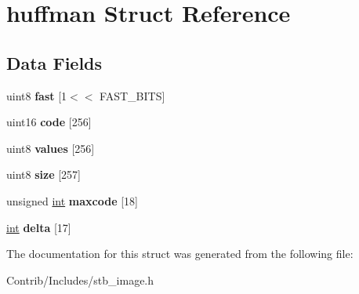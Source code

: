 \hypertarget{structhuffman}{}\section{huffman Struct Reference}
\label{structhuffman}
\subsection*{Data Fields}
\begin{DoxyCompactItemize}
\item 
uint8 {\bfseries fast} \mbox{[}1$<$$<$ F\+A\+S\+T\+\_\+\+B\+I\+TS\mbox{]}\hypertarget{structhuffman_ad836475a017b1b444e9a914e1eec51d0}{}\label{structhuffman_ad836475a017b1b444e9a914e1eec51d0}

\item 
uint16 {\bfseries code} \mbox{[}256\mbox{]}\hypertarget{structhuffman_a0fc037b98e20124af388ef635f803e46}{}\label{structhuffman_a0fc037b98e20124af388ef635f803e46}

\item 
uint8 {\bfseries values} \mbox{[}256\mbox{]}\hypertarget{structhuffman_af5220e65f3703ec44b1d560a64289c48}{}\label{structhuffman_af5220e65f3703ec44b1d560a64289c48}

\item 
uint8 {\bfseries size} \mbox{[}257\mbox{]}\hypertarget{structhuffman_af04b11aec0852598c7715255ebaf6ca2}{}\label{structhuffman_af04b11aec0852598c7715255ebaf6ca2}

\item 
unsigned \hyperlink{_s_d_l__thread_8h_a6a64f9be4433e4de6e2f2f548cf3c08e}{int} {\bfseries maxcode} \mbox{[}18\mbox{]}\hypertarget{structhuffman_a8cadba645a8c1ea9b2bb85317c877d30}{}\label{structhuffman_a8cadba645a8c1ea9b2bb85317c877d30}

\item 
\hyperlink{_s_d_l__thread_8h_a6a64f9be4433e4de6e2f2f548cf3c08e}{int} {\bfseries delta} \mbox{[}17\mbox{]}\hypertarget{structhuffman_aadb642e8e056b2abcdcd60629d5afa2b}{}\label{structhuffman_aadb642e8e056b2abcdcd60629d5afa2b}

\end{DoxyCompactItemize}


The documentation for this struct was generated from the following file\+:\begin{DoxyCompactItemize}
\item 
Contrib/\+Includes/stb\+\_\+image.\+h\end{DoxyCompactItemize}
